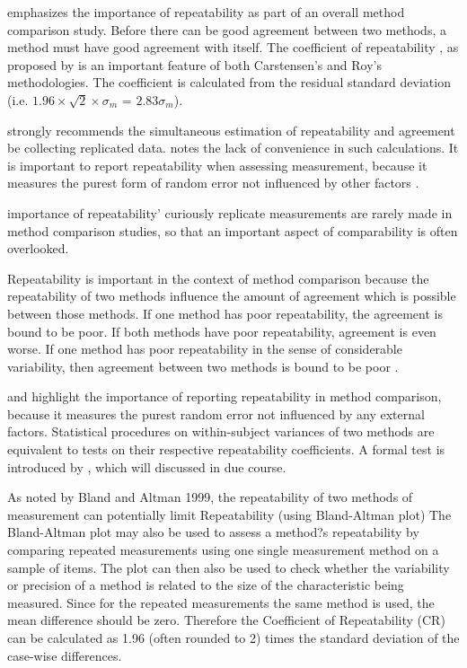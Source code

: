 \documentclass[12pt, a4paper]{report}
\theoremstyle{plain}
\theoremstyle{definition}
\theoremstyle{remark}
\begin{document}
	
	\citet{Barnhart} emphasizes the importance of repeatability as part of an overall method comparison study. Before there can be good agreement between two methods, a method must have good agreement with itself. The coefficient of repeatability , as proposed by \citet{BA99} is an important feature of both Carstensen's and Roy's methodologies. The coefficient is calculated from the residual standard deviation (i.e. $1.96 \times \sqrt{2} \times \sigma_m$ = $2.83 \sigma_m$).
	
	\bigskip
	
	\citet{BA99} strongly recommends the simultaneous estimation of repeatability and agreement be collecting replicated data. \citet{ARoy2009} notes the lack of convenience in such calculations.
	It is important to report repeatability when assessing measurement, because it measures the purest form of random error not influenced by other factors \citep{Barnhart}.	
	
	importance of repeatability' curiously replicate measurements are rarely made in method comparison studies, so that an important aspect of comparability is often overlooked.
	
	Repeatability is important in the context of method comparison because the repeatability of two methods influence the amount of agreement which is possible between those methods. If one method has poor repeatability, the agreement is bound to be poor. If both methods have poor repeatability, agreement is even worse. If one method has poor repeatability in the sense of considerable variability, then agreement between two methods is bound to be poor \citep{ARoy2009}.
	
	\citet{barnhart} and \citet{roy} highlight the importance of reporting repeatability in method comparison, because it measures the purest random error not influenced by any external factors. Statistical procedures on within-subject variances of two methods are equivalent to tests on their respective repeatability coefficients. A formal test is introduced by \citet{roy}, which will discussed in due course.
	
	As noted by Bland and Altman 1999, the repeatability of two methods of measurement can  potentially limit
	Repeatability (using Bland-Altman plot)
	The Bland-Altman plot may also be used to assess a method?s repeatability by comparing repeated measurements using one single measurement method on a sample of items.
	The plot can then also be used to check whether the variability or precision of a method is related to the size of the characteristic being measured.
	Since for the repeated measurements the same method is used, the mean difference should be zero.
	Therefore the Coefficient of Repeatability (CR) can be calculated as 1.96 (often rounded to 2) times the standard deviation of the case-wise differences.
	
\end{document}
